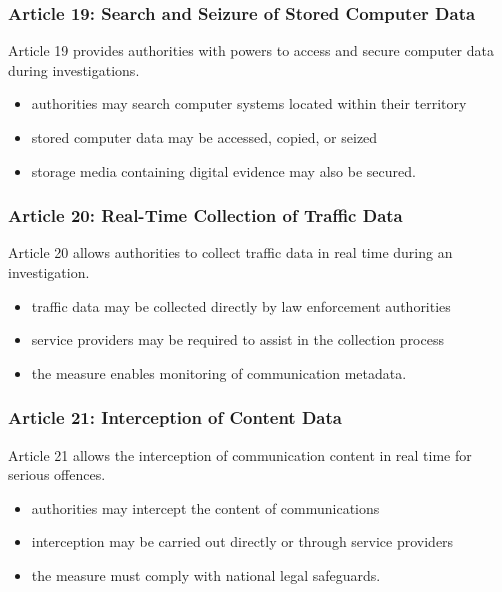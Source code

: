 \subsubsection*{Article 19: Search and Seizure of Stored Computer Data}

Article 19 provides authorities with powers to access and secure computer data during investigations.

\begin{itemize}
\item authorities may search computer systems located within their territory
\item stored computer data may be accessed, copied, or seized
\item storage media containing digital evidence may also be secured.
\end{itemize}



\subsubsection*{Article 20: Real-Time Collection of Traffic Data}

Article 20 allows authorities to collect traffic data in real time during an investigation.

\begin{itemize}
\item traffic data may be collected directly by law enforcement authorities
\item service providers may be required to assist in the collection process
\item the measure enables monitoring of communication metadata.
\end{itemize}



\subsubsection*{Article 21: Interception of Content Data}

Article 21 allows the interception of communication content in real time for serious offences.

\begin{itemize}
\item authorities may intercept the content of communications
\item interception may be carried out directly or through service providers
\item the measure must comply with national legal safeguards.
\end{itemize}



